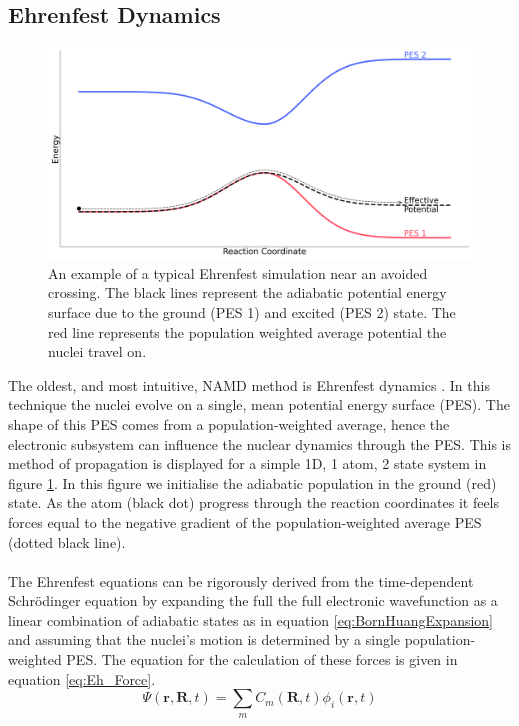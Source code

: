 \subsection{Ehrenfest Dynamics}
\begin{figure}[htp]
  \includegraphics[width=\textwidth]{./img/Eh_hop.png}
  \caption{\label{fig:Eh_diag}An example of a typical Ehrenfest simulation near an avoided crossing. The black lines represent the adiabatic potential energy surface due to the ground (PES 1) and excited (PES 2) state. The red line represents the population weighted average potential the nuclei travel on.}
\end{figure}
\noindent The oldest, and most intuitive, NAMD method is Ehrenfest dynamics \cite{Ehren1927}. In this technique the nuclei evolve on a single, mean potential energy surface (PES). The shape of this PES comes from a population-weighted average, hence the electronic subsystem can influence the nuclear dynamics through the PES. This is method of propagation is displayed for a simple 1D, 1 atom, 2 state system in figure \ref{fig:Eh_diag}. In this figure we initialise the adiabatic population in the ground (red) state. As the atom (black dot) progress through the reaction coordinates it feels forces equal to the negative gradient of the population-weighted average PES (dotted black line).
\\\\
The Ehrenfest equations can be rigorously derived from the time-dependent Schr\"odinger equation by expanding the full the full electronic wavefunction as a linear combination of adiabatic states as in equation \eqref{eq:BornHuangExpansion} and assuming that the nuclei's motion is determined by a single population-weighted PES. The equation for the calculation of these forces is given in equation \eqref{eq:Eh_Force}.
\begin{equation}
  \Psi(\mathbf{r}, \mathbf{R}, t) = \sum_{m} C_{m}(\mathbf{R}, t) \phi_i(\mathbf{r}, t)
  \label{eq:BornHuangExpansion}
\end{equation}
